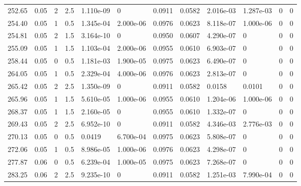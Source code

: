 \documentclass[preview]{standalone}
\begin{document}
{{{\begin{tabular}{L{1.2cm}C{1.2cm} C{0.3cm}C{0.5cm} C{1.4cm}C{1.4cm} C{1.4cm}C{1.4cm} C{1.6cm}C{1.6cm} C{1.6cm}C{1.6cm}}
  252.65  &  0.05  & 2     & 2.5 &  1.110e-09  & 0  &  0.0911&   0.0582& 2.016e-03 & 1.287e-03   &  0 & 0  \\ 
  254.40  &  0.05  & 1     & 0.5 &  1.345e-04  & 2.000e-06  &  0.0976&   0.0623& 8.118e-07 & 1.000e-06   &  0 & 0  \\ 
  254.81  &  0.05  & 2     & 1.5 &  3.164e-10  & 0  &  0.0950&   0.0607& 4.290e-07 & 0   &  0 & 0  \\ 
  255.09  &  0.05  & 1     & 1.5 &  1.103e-04  & 2.000e-06  &  0.0955&   0.0610& 6.903e-07 & 0   &  0 & 0  \\ 
  258.44  &  0.05  & 0     & 0.5 &  1.181e-03  & 1.900e-05  &  0.0975&   0.0623& 6.490e-07 & 0   &  0 & 0  \\ 
  264.05  &  0.05  & 1     & 0.5 &  2.329e-04  & 4.000e-06  &  0.0976&   0.0623& 2.813e-07 & 0   &  0 & 0  \\ 
  265.42  &  0.05  & 2     & 2.5 &  1.350e-09  & 0  &  0.0911&   0.0582& 0.0158 & 0.0101   &  0 & 0  \\ 
  265.96  &  0.05  & 1     & 1.5 &  5.610e-05  & 1.000e-06  &  0.0955&   0.0610& 1.204e-06 & 1.000e-06   &  0 & 0  \\ 
  268.37  &  0.05  & 1     & 1.5 &  2.160e-05  & 0  &  0.0955&   0.0610& 1.332e-07 & 0   &  0 & 0  \\ 
  269.43  &  0.05  & 2     & 2.5 &  6.952e-10  & 0  &  0.0911&   0.0582& 4.346e-03 & 2.776e-03   &  0 & 0  \\ 
  270.13  &  0.05  & 0     & 0.5 &  0.0419  & 6.700e-04  &  0.0975&   0.0623& 5.808e-07 & 0   &  0 & 0  \\ 
  272.06  &  0.05  & 1     & 0.5 &  8.986e-05  & 1.000e-06  &  0.0976&   0.0623& 4.298e-07 & 0   &  0 & 0  \\ 
  277.87  &  0.06  & 0     & 0.5 &  6.239e-04  & 1.000e-05  &  0.0975&   0.0623& 7.268e-07 & 0   &  0 & 0  \\ 
  283.25  &  0.06  & 2     & 2.5 &  9.235e-10  & 0  &  0.0911&   0.0582& 1.251e-03 & 7.990e-04   &  0 & 0  \\ 
\hline 
\end{tabular} 

}}}
\end{document}
